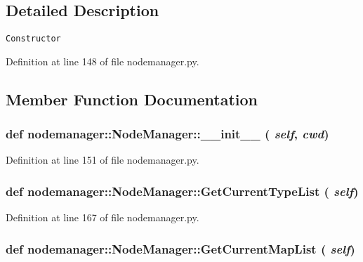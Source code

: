 \subsection{Detailed Description}


\footnotesize\begin{verbatim}
Constructor
\end{verbatim}
\normalsize
 



Definition at line 148 of file nodemanager.py.

\subsection{Member Function Documentation}
\hypertarget{classnodemanager_1_1NodeManager_5358e4bbce92e7efa94e8a8af6539d51}{
\subsubsection[\_\-\_\-init\_\-\_\-]{\setlength{\rightskip}{0pt plus 5cm}def nodemanager::Node\-Manager::\_\-\_\-init\_\-\_\- ( {\em self},  {\em cwd})}}
\label{classnodemanager_1_1NodeManager_5358e4bbce92e7efa94e8a8af6539d51}




Definition at line 151 of file nodemanager.py.\hypertarget{classnodemanager_1_1NodeManager_24575a8cc619f68041969be904d0f3b0}{
\subsubsection[GetCurrentTypeList]{\setlength{\rightskip}{0pt plus 5cm}def nodemanager::Node\-Manager::Get\-Current\-Type\-List ( {\em self})}}
\label{classnodemanager_1_1NodeManager_24575a8cc619f68041969be904d0f3b0}




Definition at line 167 of file nodemanager.py.\hypertarget{classnodemanager_1_1NodeManager_a504ce44097274d42f0f3436d2576361}{
\subsubsection[GetCurrentMapList]{\setlength{\rightskip}{0pt plus 5cm}def nodemanager::Node\-Manager::Get\-Current\-Map\-List ( {\em self})}}
\label{classnodemanager_1_1NodeManager_a504ce44097274d42f0f3436d2576361}




